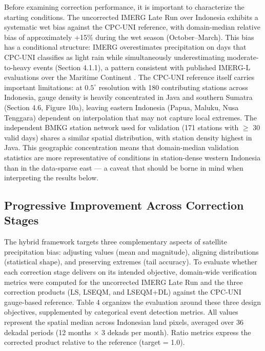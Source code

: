 \documentclass[11pt,a4paper]{article}
\begin{document}
Before examining correction performance, it is important to characterize
the starting conditions. The uncorrected IMERG Late Run over Indonesia
exhibits a systematic wet bias against the CPC-UNI reference, with
domain-median relative bias of approximately +15\% during the wet season
(October--March). This bias has a conditional structure: IMERG
overestimates precipitation on days that CPC-UNI classifies as light
rain while simultaneously underestimating moderate-to-heavy events
(Section 4.1.1), a pattern consistent with published IMERG-L evaluations
over the Maritime Continent \cite{ref31,ref32,ref33}. The CPC-UNI reference itself
carries important limitations: at \(0.5^{\circ}\) resolution with 180
contributing stations across Indonesia, gauge density is heavily
concentrated in Java and southern Sumatra (Section 4.6, Figure 10a),
leaving eastern Indonesia (Papua, Maluku, Nusa Tenggara) dependent on
interpolation that may not capture local extremes. The independent BMKG
station network used for validation (171 stations with \(\geq\) 30 valid
days) shares a similar spatial distribution, with station density
highest in Java. This geographic concentration means that domain-median
validation statistics are more representative of conditions in
station-dense western Indonesia than in the data-sparse east --- a
caveat that should be borne in mind when interpreting the results below.

\subsection{Progressive Improvement Across Correction
Stages}

The hybrid framework targets three complementary aspects of satellite
precipitation bias: adjusting values (mean and magnitude), aligning
distributions (statistical shape), and preserving extremes (tail
accuracy). To evaluate whether each correction stage delivers on its
intended objective, domain-wide verification metrics were computed for
the uncorrected IMERG Late Run and the three correction products (LS,
LSEQM, and LSEQM+DL) against the CPC-UNI gauge-based reference. Table 4
organizes the evaluation around these three design objectives,
supplemented by categorical event detection metrics. All values
represent the spatial median across Indonesian land pixels, averaged
over 36 dekadal periods (12 months \(\times\) 3 dekads per month). Ratio
metrics express the corrected product relative to the reference (target
= 1.0).
\end{document}
